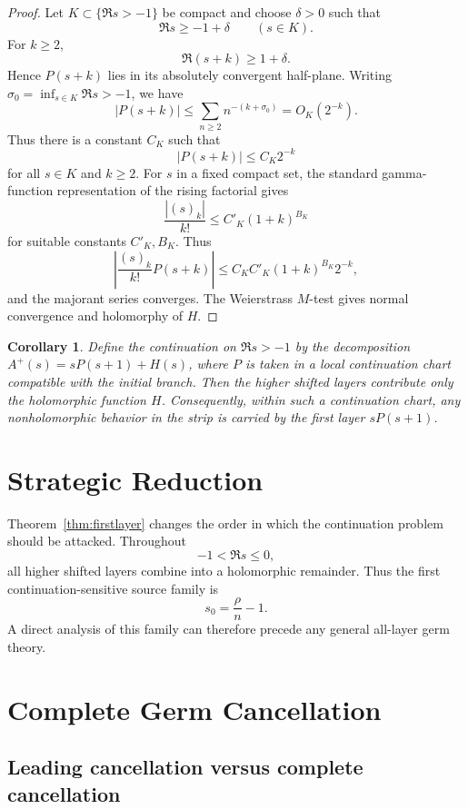 \documentclass[11pt]{article}
\newtheorem{corollary}[theorem]{Corollary}
\theoremstyle{definition}
\begin{document}
\begin{proof}
Let $K\subset\{\Re s>-1\}$ be compact and choose $\delta>0$ such that
\[
\Re s\ge-1+\delta
\qquad(s\in K).
\]
For $k\ge2$,
\[
\Re(s+k)\ge1+\delta.
\]
Hence $P(s+k)$ lies in its absolutely convergent half-plane. Writing
$\sigma_0=\inf_{s\in K}\Re s>-1$, we have
\[
|P(s+k)|
\le
\sum_{n\ge2}n^{-(k+\sigma_0)}
=O_K(2^{-k}).
\]
Thus there is a constant $C_K$ such that
\[
|P(s+k)|\le C_K2^{-k}
\]
for all $s\in K$ and $k\ge2$.
For $s$ in a fixed compact set, the standard gamma-function representation of the rising factorial gives
\[
\frac{|(s)_k|}{k!}\le C'_K(1+k)^{B_K}
\]
for suitable constants $C'_K,B_K$. Thus
\[
\left|
\frac{(s)_k}{k!}P(s+k)
\right|
\le
C_KC'_K(1+k)^{B_K}2^{-k},
\]
and the majorant series converges. The Weierstrass $M$-test gives normal convergence and holomorphy of $H$.
\end{proof}

\begin{corollary}
Define the continuation on $\Re s>-1$ by the decomposition $A^+(s)=sP(s+1)+H(s)$, where $P$ is taken in a local continuation chart compatible with the initial branch. Then the higher shifted layers contribute only the holomorphic function $H$. Consequently, within such a continuation chart, any nonholomorphic behavior in the strip is carried by the first layer $sP(s+1)$.
\end{corollary}

\section{Strategic Reduction}

Theorem~\ref{thm:firstlayer} changes the order in which the continuation problem should be attacked. Throughout
\[
-1<\Re s\le0,
\]
all higher shifted layers combine into a holomorphic remainder. Thus the first continuation-sensitive source family is
\[
s_0=\frac{\rho}{n}-1.
\]
A direct analysis of this family can therefore precede any general all-layer germ theory.

\section{Complete Germ Cancellation}

\subsection{Leading cancellation versus complete cancellation}
\end{document}
